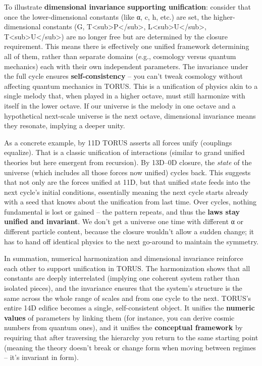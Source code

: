 \documentclass[
]{article}
\begin{document}
To illustrate \textbf{dimensional invariance supporting unification}:
consider that once the lower-dimensional constants (like α, c, h, etc.)
are set, the higher-dimensional constants (G,
T\textless sub\textgreater P\textless/sub\textgreater,
L\textless sub\textgreater U\textless/sub\textgreater,
T\textless sub\textgreater U\textless/sub\textgreater) are no longer
free but are determined by the closure requirement\hspace{0pt}. This
means there is effectively one unified framework determining all of
them, rather than separate domains (e.g., cosmology versus quantum
mechanics) each with their own independent parameters. The invariance
under the full cycle ensures \textbf{self-consistency} -- you can't
tweak cosmology without affecting quantum mechanics in TORUS. This is a
unification of physics akin to a single melody that, when played in a
higher octave, must still harmonize with itself in the lower octave. If
our universe is the melody in one octave and a hypothetical next-scale
universe is the next octave, dimensional invariance means they resonate,
implying a deeper unity.

As a concrete example, by 11D TORUS asserts all forces unify (couplings
equalize)\hspace{0pt}. That is a classic unification of interactions
(similar to grand unified theories but here emergent from recursion). By
13D--0D closure, the \emph{state} of the universe (which includes all
those forces now unified) cycles back. This suggests that not only are
the forces unified at 11D, but that unified state feeds into the next
cycle's initial conditions, essentially meaning the next cycle starts
already with a seed that knows about the unification from last time.
Over cycles, nothing fundamental is lost or gained -- the pattern
repeats, and thus the \textbf{laws stay unified and invariant}. We don't
get a universe one time with different α or different particle content,
because the closure wouldn't allow a sudden change; it has to hand off
identical physics to the next go-around to maintain the symmetry.

In summation, numerical harmonization and dimensional invariance
reinforce each other to support unification in TORUS. The harmonization
shows that all constants are deeply interrelated (implying one coherent
system rather than isolated pieces), and the invariance ensures that the
system's structure is the same across the whole range of scales and from
one cycle to the next. TORUS's entire 14D edifice becomes a single,
self-consistent object. It unifies the \textbf{numeric values} of
parameters by linking them (for instance, you can derive cosmic numbers
from quantum ones), and it unifies the \textbf{conceptual framework} by
requiring that after traversing the hierarchy you return to the same
starting point (meaning the theory doesn't break or change form when
moving between regimes -- it's invariant in form).
\end{document}
